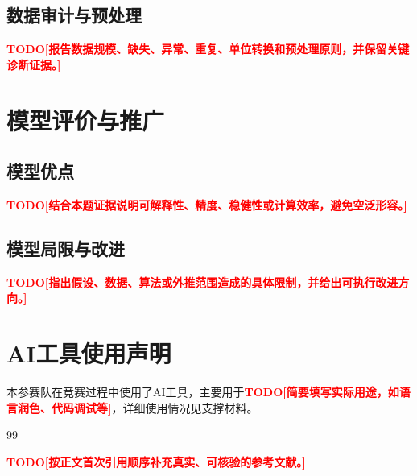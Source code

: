 \documentclass[UTF8,12pt,a4paper]{ctexart}
\newcommand{\TODO}[1]{\textcolor{red}{\textbf{TODO[#1]}}}
\begin{document}
\subsection{数据审计与预处理}

\TODO{报告数据规模、缺失、异常、重复、单位转换和预处理原则，并保留关键诊断证据。}


\section{模型评价与推广}

\subsection{模型优点}

\TODO{结合本题证据说明可解释性、精度、稳健性或计算效率，避免空泛形容。}

\subsection{模型局限与改进}

\TODO{指出假设、数据、算法或外推范围造成的具体限制，并给出可执行改进方向。}

\section*{AI工具使用声明}

本参赛队在竞赛过程中使用了AI工具，主要用于\TODO{简要填写实际用途，如语言润色、代码调试等}，详细使用情况见支撑材料。

{\footnotesize
\begin{thebibliography}{99}
\setlength{\itemsep}{0.2em}

\TODO{按正文首次引用顺序补充真实、可核验的参考文献。}

\end{thebibliography}
}
\label{body-end}

\clearpage
\appendix
{}
\end{document}
